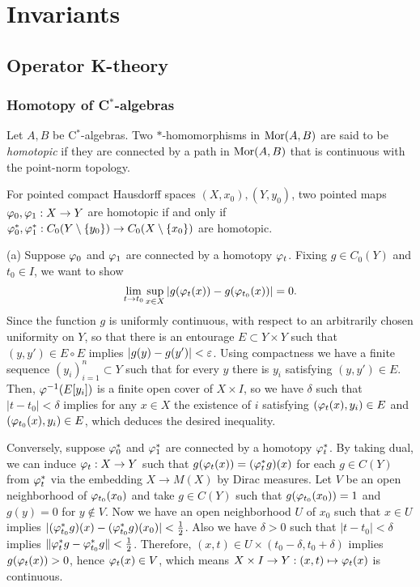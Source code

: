 \documentclass{../../large}
\begin{document}
\part{Invariants}
\chapter{Operator K-theory}


\section{Homotopy of C$^*$-algebras}

\begin{prb}
Let $A,B$ be C$^*$-algebras.
Two $*$-homomorphisms in $\operatorname{Mor}(A,B)$ are said to be \emph{homotopic} if they are connected by a path in $\operatorname{Mor}(A,B)$ that is continuous with the point-norm topology.
\begin{parts}
\item For pointed compact Hausdorff spaces $(X,x_0),(Y,y_0)$, two pointed maps $\varphi_0,\varphi_1:X\to Y$ are homotopic if and only if $\varphi_0^*,\varphi_1^*:C_0(Y\setminus\{y_0\})\to C_0(X\setminus\{x_0\})$ are homotopic.
\end{parts}
\end{prb}
\begin{pf}
(a)
Suppose $\varphi_0$ and $\varphi_1$ are connected by a homotopy $\varphi_t$.
Fixing $g\in C_0(Y)$ and $t_0\in I$, we want to show
\[\lim_{t\to t_0}\sup_{x\in X}|g(\varphi_t(x))-g(\varphi_{t_0}(x))|=0.\]
Since the function $g$ is uniformly continuous, with respect to an arbitrarily chosen uniformity on $Y$, so that there is an entourage $E\subset Y\times Y$ such that $(y,y')\in E\circ E$ implies $|g(y)-g(y')|<\varepsilon$.
Using compactness we have a finite sequence $(y_i)_{i=1}^n\subset Y$ such that for every $y$ there is $y_i$ satisfying $(y,y')\in E$.
Then, $\varphi^{-1}(E[y_i])$ is a finite open cover of $X\times I$, so we have $\delta$ such that $|t-t_0|<\delta$ implies for any $x\in X$ the existence of $i$ satisfying $(\varphi_t(x),y_i)\in E$ and $(\varphi_{t_0}(x),y_i)\in E$, which deduces the desired inequality.

Conversely, suppose $\varphi_0^*$ and $\varphi_1^*$ are connected by a homotopy $\varphi_t^*$.
By taking dual, we can induce $\varphi_t:X\to Y$ such that $g(\varphi_t(x))=(\varphi_t^*g)(x)$ for each $g\in C(Y)$ from $\varphi_t^*$ via the embedding $X\to M(X)$ by Dirac measures.
Let $V$ be an open neighborhood of $\varphi_{t_0}(x_0)$ and take $g\in C(Y)$ such that $g(\varphi_{t_0}(x_0))=1$ and $g(y)=0$ for $y\notin V$.
Now we have an open neighborhood $U$ of $x_0$ such that $x\in U$ implies $|(\varphi_{t_0}^*g)(x)-(\varphi_{t_0}^*g)(x_0)|<\frac12$.
Also we have $\delta>0$ such that $|t-t_0|<\delta$ implies $\|\varphi_t^*g-\varphi_{t_0}^*g\|<\frac12$.
Therefore, $(x,t)\in U\times(t_0-\delta,t_0+\delta)$ implies $g(\varphi_t(x))>0$, hence $\varphi_t(x)\in V$, which means $X\times I\to Y:(x,t)\mapsto\varphi_t(x)$ is continuous.
\end{pf}
\end{document}
